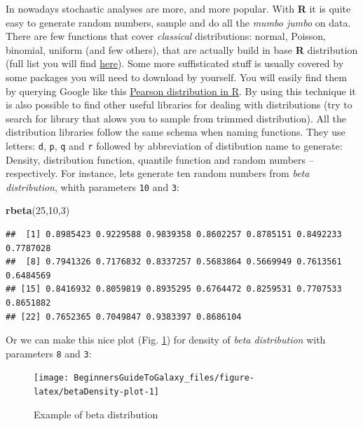 \documentclass[]{book}
\newenvironment{Shaded}{\begin{snugshade}}{\end{snugshade}}
\newcommand{\KeywordTok}[1]{\textcolor[rgb]{0.12,0.11,0.11}{\textbf{#1}}}
\newcommand{\DecValTok}[1]{\textcolor[rgb]{0.69,0.50,0.00}{#1}}
\newcommand{\NormalTok}[1]{\textcolor[rgb]{0.12,0.11,0.11}{#1}}
\theoremstyle{definition}
\theoremstyle{definition}
\theoremstyle{definition}
\theoremstyle{remark}
\begin{document}
In nowadays stochastic analyses are more, and more popular. With
\textbf{R} it is quite easy to generate random numbers, sample and do
all the \emph{mumbo jumbo} on data. There are few functions that cover
\emph{classical} distributions: normal, Poisson, binomial, uniform (and
few others), that are actually build in base \textbf{R} distribution
(full list you will find
\href{https://stat.ethz.ch/R-manual/R-devel/library/stats/html/Distributions.html}{here}).
Some more suffisticated stuff is usually covered by some packages you
will need to download by yourself. You will easily find them by querying
Google like this
\href{https://www.google.com/search?client=ubuntu\&channel=fs\&q=Pearson+distribution+in+R\&ie=utf-8\&oe=utf-8\&gfe_rd=cr\&dcr=0\&ei=KTI5Ws_7LfPBXrSBr7gO}{Pearson
distribution in R}. By using this technique it is also possible to find
other useful libraries for dealing with distributions (try to search for
library that alows you to sample from trimmed distribution). All the
distribution libraries follow the same schema when naming functions.
They use letters: \texttt{d}, \texttt{p}, \texttt{q} and \texttt{r}
followed by abbreviation of distibution name to generate: Density,
distribution function, quantile function and random numbers --
respectively. For instance, lets generate ten random numbers from
\emph{beta distribution}, whith parameters \texttt{10} and \texttt{3}:

\begin{Shaded}
\begin{Highlighting}[]
\KeywordTok{rbeta}\NormalTok{(}\DecValTok{25}\NormalTok{,}\DecValTok{10}\NormalTok{,}\DecValTok{3}\NormalTok{)}
\end{Highlighting}
\end{Shaded}

\begin{verbatim}
##  [1] 0.8985423 0.9229588 0.9839358 0.8602257 0.8785151 0.8492233 0.7787028
##  [8] 0.7941326 0.7176832 0.8337257 0.5683864 0.5669949 0.7613561 0.6484569
## [15] 0.8416932 0.8059819 0.8935295 0.6764472 0.8259531 0.7707533 0.8651882
## [22] 0.7652365 0.7049847 0.9383397 0.8686104
\end{verbatim}

Or we can make this nice plot (Fig. \ref{fig:betaDensity-plot}) for
density of \emph{beta distribution} with parameters \texttt{8} and
\texttt{3}:

\begin{figure}

{\centering \texttt{[image: BeginnersGuideToGalaxy\_files/figure-latex/betaDensity-plot-1]} 

}

\caption{Example of beta distribution}\label{fig:betaDensity-plot}
\end{figure}
\end{document}
